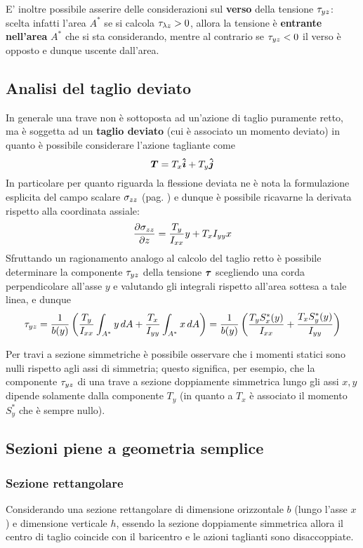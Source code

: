 		
		E' inoltre possibile asserire delle considerazioni sul \textbf{verso} della tensione $\tau_{yz}$: scelta infatti l'area $A^*$ se si calcola $\tau_{\lambda z} > 0$, allora la tensione è \textbf{entrante nell'area} $A^*$ che si sta considerando, mentre al contrario se $\tau_{yz} < 0$ il verso è opposto e dunque uscente dall'area.
		
	\subsection{Analisi del taglio deviato}
		In generale una trave non è sottoposta ad un'azione di taglio puramente retto, ma è soggetta ad un \textbf{taglio deviato} (cui è associato un momento deviato) in quanto è possibile considerare l'azione tagliante come
		\[\boldsymbol{T} = T_x\boldsymbol{\hat{i}} + T_y \boldsymbol{\hat{j}}\]
		In particolare per quanto riguarda la flessione deviata ne è nota la formulazione esplicita del campo scalare $\sigma_{zz}$ (pag. \pageref{sec:fless:deviata}) e dunque è possibile ricavarne la derivata rispetto alla coordinata assiale:
		\[ \frac{\partial \sigma_{zz}}{\partial z} = \frac {T_y} {I_{xx}} y + T_x I_{yy} x \]
		Sfruttando un ragionamento analogo al calcolo del taglio retto è possibile determinare la componente $\tau_{yz}$ della tensione $\boldsymbol{\tau}$ scegliendo una corda perpendicolare all'asse $y$ e valutando gli integrali rispetto all'area sottesa a tale linea, e dunque
		\[ \tau_{yz} = \frac 1 {b(y)} \left(\frac {T_y} {I_{xx}} \int_{A^*} y\, dA + \frac {T_x} {I_{yy}} \int_{A^*} x\, dA\right) = \frac 1  {b(y)} \left(\frac{T_y S_x^*(y)}{I_{xx}} + \frac{T_x S_y^*(y)}{I_{yy}} \right) \]
		\begin{nota}
			Per travi a sezione simmetriche è possibile osservare che i momenti statici sono nulli rispetto agli assi di simmetria; questo significa, per esempio, che la componente $\tau_{yz}$ di una trave a sezione doppiamente simmetrica lungo gli assi $x,y$ dipende solamente dalla componente $T_y$ (in quanto a $T_x$ è associato il momento $S_y^*$ che è sempre nullo).
		\end{nota}
		
	\subsection{Sezioni piene a geometria semplice}
	\subsubsection{Sezione rettangolare}
		Considerando una sezione rettangolare di dimensione orizzontale $b$ (lungo l'asse $x$) e dimensione verticale $h$, essendo la sezione doppiamente simmetrica allora il centro di taglio coincide con il baricentro e le azioni taglianti sono disaccoppiate.
		
